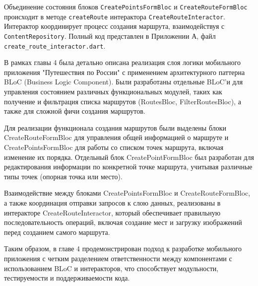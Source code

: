 Объединение состояния блоков \texttt{CreatePointsFormBloc} и \texttt{CreateRouteFormBloc}  происходит в методе \texttt{createRoute} интерактора \texttt{CreateRouteInteractor}. Интерактор координирует процесс создания маршрута, взаимодействуя с \texttt{ContentRepository}. Полный код представлен в Приложении А, файл \texttt{create\_route\_interactor.dart}.

В рамках главы 4 была детально описана реализация слоя логики мобильного приложения "Путешествия по России" с применением архитектурного паттерна BLoC (Business Logic Component). Были разработаны отдельные BLoC'и для управления состоянием различных функциональных модулей, таких как получение и фильтрация списка маршрутов (RoutesBloc, FilterRoutesBloc), а также для сложной фичи создания маршрутов.   

Для реализации функционала создания маршрутов были выделены блоки CreateRouteFormBloc  для управления общей информацией о маршруте и CreatePointsFormBloc  для работы со списком точек маршрута, включая изменение их порядка. Отдельный блок CreatePointFormBloc  был разработан для редактирования информации по конкретной точке маршрута, учитывая различные типы точек (опорная точка или место).   

Взаимодействие между блоками CreatePointsFormBloc и CreateRouteFormBloc, а также координация отправки запросов к слою данных, реализованы в интеракторе CreateRouteInteractor, который обеспечивает правильную последовательность операций, включая создание мест и загрузку изображений перед созданием самого маршрута.   

Таким образом, в главе 4 продемонстрирован подход к разработке мобильного приложения с четким разделением ответственности между компонентами с использованием BLoC и интеракторов, что способствует модульности, тестируемости и поддерживаемости кода.


